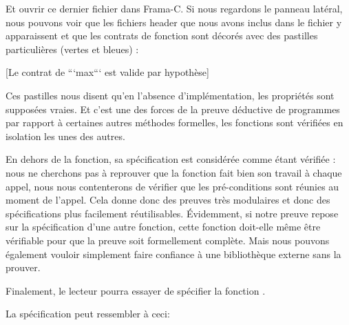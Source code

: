 Et ouvrir ce dernier fichier dans Frama-C. Si nous regardons le panneau latéral, 
nous pouvons voir que les fichiers header que nous avons inclus dans le fichier 
 y apparaissent et que les contrats de fonction sont décorés avec des 
pastilles particulières (vertes et bleues) :



[Le contrat de ```max``` est valide par hypothèse]


Ces pastilles nous disent qu'en l'absence d'implémentation, les propriétés sont
supposées vraies. Et c'est une des forces de la preuve déductive de programmes 
par rapport à certaines autres méthodes formelles, les fonctions sont vérifiées
en isolation les unes des autres.



En dehors de la fonction, sa spécification est considérée comme étant 
vérifiée : nous ne cherchons pas à reprouver que la fonction fait bien son travail
à chaque appel, nous nous contenterons de vérifier que les pré-conditions sont 
réunies au moment de l'appel. Cela donne donc des preuves très modulaires et donc 
des spécifications plus facilement réutilisables. Évidemment, si notre preuve 
repose sur la spécification d'une autre fonction, cette fonction doit-elle même 
être vérifiable pour que la preuve soit formellement complète. Mais nous pouvons
également vouloir simplement faire confiance à une bibliothèque externe sans la
prouver.



Finalement, le lecteur pourra essayer de spécifier la fonction .



La spécification peut ressembler à ceci:




